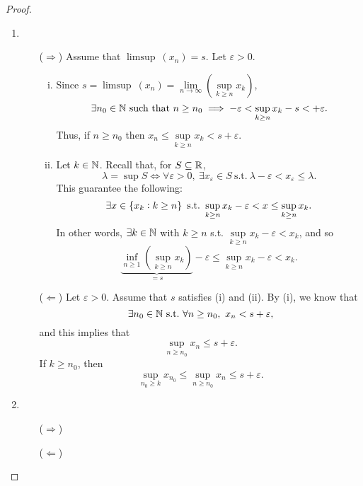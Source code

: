 \documentclass[11pt,openany]{article}
\begin{document}
\begin{proof}
\begin{enumerate}[(1)]
\item \begin{itemize}
	\item[($\Rightarrow$)] Assume that $\limsup\ (x_n)=s$. Let $\varepsilon>0$. 
	\begin{enumerate}[(i)]
		\item Since $s=\limsup\ (x_n)=\lim\limits_{n\to\infty}\left(\sup\limits_{k\geq n}x_k\right)$, \[
		\exists n_0\in\mathbb{N}\ \text{such that}\ n\geq n_0\implies -\varepsilon< \sup\limits_{k\geq n} x_k-s<+\varepsilon.
		\] Thus, if $n\geq n_0$ then $x_n\leq\sup\limits_{k\geq n} x_k<s+\varepsilon$.
		\item Let $k\in\mathbb{N}$. Recall that, for $S\subseteq\mathbb{R}$, \[
		\boxed{\lambda=\sup S\iff\forall\varepsilon>0,\ \exists x_\varepsilon\in S\ \text{s.t.}\ \lambda-\varepsilon<x_\varepsilon\leq\lambda}.
		\] This guarantee the following: \[
		\exists x\in\set{x_k:k\geq n}\ \text{s.t.}\ \sup\limits_{k\geq n}x_k-\varepsilon < x\leq\sup\limits_{k\geq n}x_k.
		\] In other words, $\exists k\in\mathbb{N}$ with $k\geq n$ s.t. $\sup\limits_{k\geq n}x_k-\varepsilon<x_k$, and so \[
		\underbrace{\inf\limits_{n\geq 1}\left(\sup_{k\geq n}x_k\right)}_{=s}-\varepsilon\leq\sup\limits_{k\geq n}x_k-\varepsilon<x_k.
		\]
	\end{enumerate}
	\item[($\Leftarrow$)] Let $\varepsilon>0$. Assume that $s$ satisfies (i) and (ii). By (i), we know that \[
	\exists n_0\in\mathbb{N}\ \text{s.t.}\ \forall n\geq n_0,\ x_n<s+\varepsilon,
	\] and this implies that \[
	\sup\limits_{n\geq n_0}x_n\leq s+\varepsilon.
	\] If $k\geq n_0$, then \[
	\sup\limits_{n_0\geq k}x_{n_0}\leq
	\sup\limits_{n\geq n_0}x_n\leq s+\varepsilon.
	\]
\end{itemize}
\item \begin{itemize}
	\item[($\Rightarrow$)]
	\item[($\Leftarrow$)]
\end{itemize}
\end{enumerate}
\end{proof}
\end{document}
